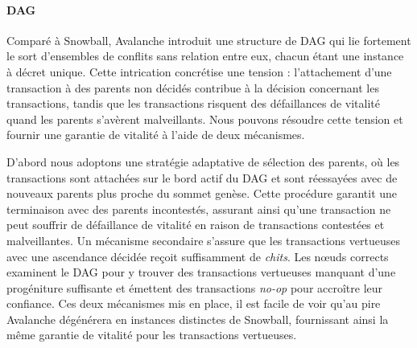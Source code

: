 \documentclass[letterpaper,twocolumn,10pt]{article}
\theoremstyle{definition}
\begin{document}
\paragraph{DAG} Comparé à Snowball, Avalanche introduit une structure de DAG qui lie fortement le sort d'ensembles de conflits sans relation entre eux, chacun étant une instance à décret unique.
Cette intrication concrétise une tension : l'attachement d'une transaction à des parents non décidés contribue à la décision concernant les transactions, tandis que les transactions risquent des défaillances de vitalité quand les parents s'avèrent malveillants.
Nous pouvons résoudre cette tension et fournir une garantie de vitalité à l'aide de deux mécanismes.

D'abord nous adoptons une stratégie adaptative de sélection des parents, où les transactions sont attachées sur le bord actif du DAG et sont réessayées avec de nouveaux parents plus proche du sommet genèse. Cette procédure garantit une terminaison avec des parents incontestés, assurant ainsi qu'une transaction ne peut souffrir de défaillance de vitalité en raison de transactions contestées et malveillantes.
Un mécanisme secondaire s'assure que les transactions vertueuses avec une ascendance décidée reçoit suffisamment de \emph{chits}. Les nœuds corrects examinent le DAG pour y trouver des transactions vertueuses manquant d'une progéniture suffisante et émettent des transactions \emph{no-op} pour accroître leur confiance.
Ces deux mécanismes mis en place, il est facile de voir qu'au pire Avalanche dégénérera en instances distinctes de Snowball, fournissant ainsi la même garantie de vitalité pour les transactions vertueuses.
\end{document}

